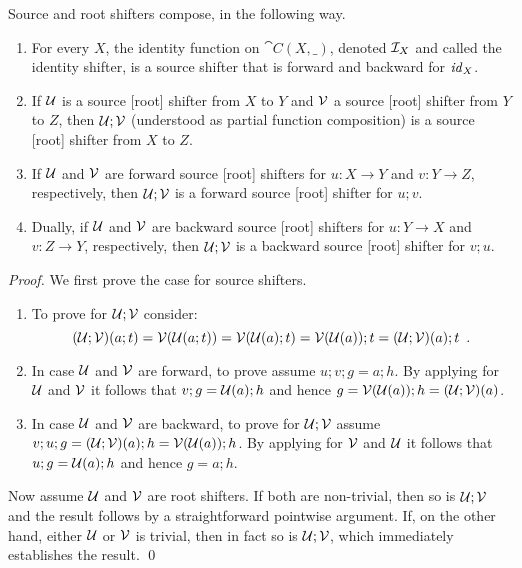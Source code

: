 %
Source and root shifters compose, in the following way.
%
\begin{proposition}
\begin{enumerate}[topsep=\smallskipamount]
\item For every $X$, the identity function on $\cat{C}(X,\_)$, denoted $\mathcal{I}_X$ and called the identity shifter, is a source shifter that is forward and backward for $\mathit{id}_X$.
\item If $\mathcal{U}$ is a source [root] shifter from $X$ to $Y$ and $\mathcal{V}$ a source [root] shifter from $Y$ to $Z$, then $\mathcal{U};\mathcal{V}$ (understood as partial function composition) is a source [root] shifter from $X$ to $Z$. 
\item If $\mathcal{U}$ and $\mathcal{V}$ are forward source [root] shifters for $u: X\to Y$ and $v: Y \to Z$, respectively, then $\mathcal{U};\mathcal{V}$ is a forward source [root] shifter for $u;v$.
\item Dually, if $\mathcal{U}$ and $\mathcal{V}$ are backward source [root] shifters for $u: Y\to X$ and $v: Z \to Y$, respectively, then $\mathcal{U};\mathcal{V}$ is a backward source [root] shifter for $v;u$.
\end{enumerate}
\end{proposition}

\begin{fullorname}
\begin{proof}
We first prove the case for source shifters.
\begin{enumerate}
\item To prove  for $\mathcal{U};\mathcal{V}$ consider:
\[ (\mathcal{U};\mathcal{V})(a;t) = \mathcal{V}(\mathcal{U}(a;t))= \mathcal{V}(\mathcal{U}(a);t)=\mathcal{V}(\mathcal{U}(a));t=(\mathcal{U};\mathcal{V})(a);t \enspace. \]

\item In case $\mathcal{U}$ and $\mathcal{V}$ are forward, to prove  assume $u;v;g=a;h$. By applying  for $\mathcal{U}$ and $\mathcal{V}$ it follows that $v;g=\mathcal{U}(a);h$ and hence $g=\mathcal{V}(\mathcal{U}(a));h=(\mathcal{U};\mathcal{V})(a)$.

\item In case $\mathcal{U}$ and $\mathcal{V}$ are backward, to prove  for $\mathcal{U};\mathcal{V}$ assume $v;u;g=(\mathcal{U};\mathcal{V})(a);h=\mathcal{V}(\mathcal{U}(a));h$. By applying  for $\mathcal{V}$ and $\mathcal{U}$ it follows that $u;g=\mathcal{U}(a);h$ and hence $g=a;h$.
\end{enumerate}
%
Now assume $\mathcal{U}$ and $\mathcal{V}$ are root shifters. If both are non-trivial, then so is $\mathcal{U};\mathcal{V}$ and the result follows by a straightforward pointwise argument. If, on the other hand, either $\mathcal{U}$ or $\mathcal{V}$ is trivial, then in fact so is $\mathcal{U};\mathcal{V}$, which immediately establishes the result.
\qed
\end{proof}
\end{fullorname}

